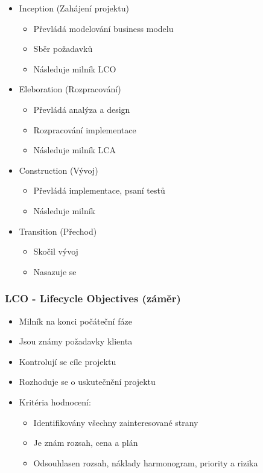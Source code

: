       \begin{itemize}
        \item Inception (Zahájení projektu)
          \begin{itemize}
            \item Převládá modelování business modelu
            \item Sběr požadavků
            \item Následuje milník LCO
          \end{itemize}
        \item Eleboration (Rozpracování)
          \begin{itemize}
            \item Převládá analýza a design
            \item Rozpracování implementace
            \item Následuje milník LCA
          \end{itemize}
        \item Construction (Vývoj)
          \begin{itemize}
            \item Převládá implementace, psaní testů
            \item Následuje milník
          \end{itemize}
        \item Transition (Přechod)
          \begin{itemize}
            \item Skočil vývoj
            \item Nasazuje se
          \end{itemize}
      \end{itemize}

      \subsubsection{LCO - Lifecycle Objectives (záměr)}
        \begin{itemize}
          \item Milník na konci počáteční fáze
          \item Jsou známy požadavky klienta
          \item Kontrolují se cíle projektu
          \item Rozhoduje se o uskutečnění projektu
          \item Kritéria hodnocení:
            \begin{itemize}
              \item Identifikovány všechny zainteresované strany
              \item Je znám rozsah, cena a plán
              \item Odsouhlasen rozsah, náklady harmonogram, priority a rizika
            \end{itemize}
        \end{itemize}

